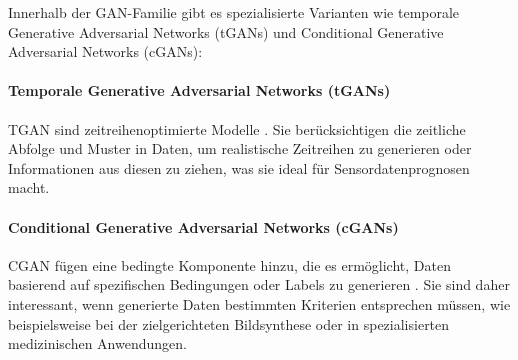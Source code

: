 Innerhalb der \ac{GAN}-Familie gibt es spezialisierte Varianten wie temporale Generative Adversarial Networks (tGANs) und Conditional Generative Adversarial Networks (cGANs):

\paragraph{Temporale Generative Adversarial Networks (tGANs)}
\ac{TGAN} sind zeitreihenoptimierte Modelle \cite{tgans_2021}. Sie berücksichtigen die zeitliche Abfolge und Muster in Daten, um realistische Zeitreihen zu generieren oder Informationen aus diesen zu ziehen, was sie ideal für Sensordatenprognosen macht.

\paragraph{Conditional Generative Adversarial Networks (cGANs)}
\ac{CGAN} fügen eine bedingte Komponente hinzu, die es ermöglicht, Daten basierend auf spezifischen Bedingungen oder Labels zu generieren \cite{AnIntrod85:online}. 
Sie sind daher interessant, wenn generierte Daten bestimmten Kriterien entsprechen müssen, wie beispielsweise bei der zielgerichteten Bildsynthese oder in spezialisierten medizinischen Anwendungen.